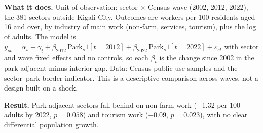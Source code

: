 \documentclass[11pt]{article}
\begin{document}
\textbf{What it does.} Unit of observation: sector $\times$ Census wave (2002, 2012, 2022), the 381 sectors outside Kigali City. Outcomes are workers per 100 residents aged 16 and over, by industry of main work (non-farm, services, tourism), plus the log of adults. The model is $y_{st} = \alpha_s + \gamma_t + \beta_{2012}\,\mathrm{Park}_s 1[t{=}2012] + \beta_{2022}\,\mathrm{Park}_s 1[t{=}2022] + \varepsilon_{st}$ with sector and wave fixed effects and no controls, so each $\beta_t$ is the change since 2002 in the park-adjacent minus interior gap. Data: Census public-use samples and the sector--park border indicator. This is a descriptive comparison across waves, not a design built on a shock.

\textbf{Result.} Park-adjacent sectors fall behind on non-farm work ($-$1.32 per 100 adults by 2022, $p=0.058$) and tourism work ($-$0.09, $p=0.023$), with no clear differential population growth.
\clearpage
\end{document}
